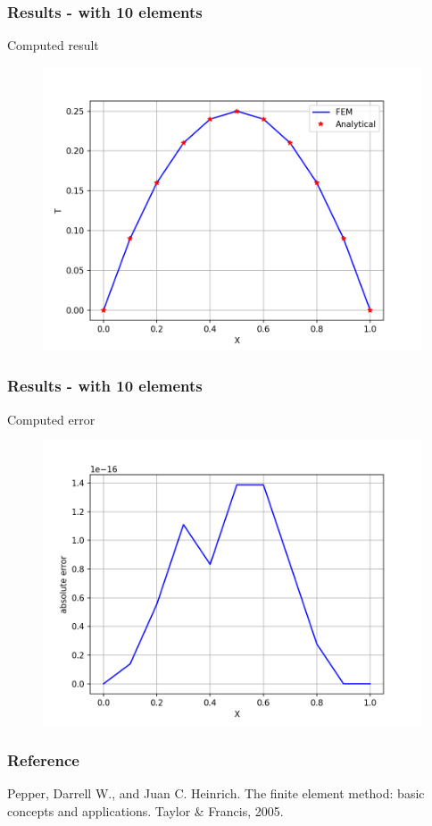 \begin{frame}
	\frametitle{Results - with 10 elements}
	Computed result
	\begin{figure}
		\includegraphics[scale=0.5]{supportingFiles/output_10.png}
	\end{figure}
\end{frame}

\begin{frame}
	\frametitle{Results - with 10 elements}
	Computed error
	\begin{figure}
		\includegraphics[scale=0.5]{supportingFiles/error_10.png}
	\end{figure}
\end{frame}


\begin{frame}
	\frametitle{Reference}
Pepper, Darrell W., and Juan C. Heinrich. The finite element method: basic concepts and applications. Taylor \& Francis, 2005.
\end{frame}
